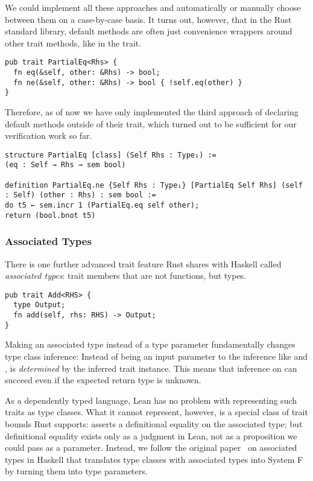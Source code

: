 We could implement all these approaches and automatically or manually choose
between them on a case-by-case basis. It turns out, however, that in the Rust standard library, default methods are often just
convenience wrappers around other trait methods, like in the  trait.

\begin{verbatim}
pub trait PartialEq<Rhs> {
  fn eq(&self, other: &Rhs) -> bool;
  fn ne(&self, other: &Rhs) -> bool { !self.eq(other) }
}
\end{verbatim}

Therefore, as of now we have only implemented the third approach of declaring
default methods outside of their trait, which turned out to be sufficient for
our verification work so far.

\begin{verbatim}
structure PartialEq [class] (Self Rhs : Type₁) :=
(eq : Self → Rhs → sem bool)

definition PartialEq.ne {Self Rhs : Type₁} [PartialEq Self Rhs] (self : Self) (other : Rhs) : sem bool :=
do t5 ← sem.incr 1 (PartialEq.eq self other);
return (bool.bnot t5)
\end{verbatim}

\subsubsection{Associated Types}

There is one further advanced trait feature Rust shares with Haskell called
\emph{associated types}: trait members that are not functions, but types.

\begin{verbatim}
pub trait Add<RHS> {
  type Output;
  fn add(self, rhs: RHS) -> Output;
}
\end{verbatim}

Making  an associated type instead of a type parameter
fundamentally changes type class inference: Instead of being an input parameter
to the inference like  and ,  is
\emph{determined} by the inferred trait instance. This means that inference on
 can succeed even if the expected return type is unknown.

As a dependently typed language, Lean has no problem with representing such
traits as type classes. What it cannot represent, however, is a special class
of trait bounds Rust supports:  asserts a
definitional equality on the associated type; but definitional equality exists
only as a judgment in Lean, not as a proposition we could pass as a parameter.
Instead, we follow the
original paper~\cite{chakravarty2005associated} on associated types in Haskell
that translates type classes with associated types into System F by turning them
into type parameters.

